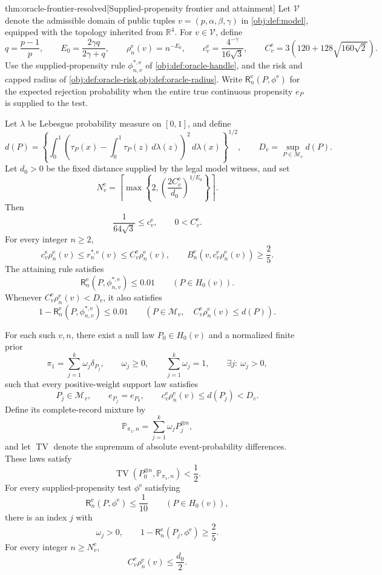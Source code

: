 \documentclass[11pt]{article}
\begin{document}
\begin{theoremv}{thm:oracle-frontier-resolved}[Supplied-propensity frontier and attainment]
Let \(\mathcal V\) denote the admissible domain of public tuples \(v=(p,\alpha,\beta,\gamma)\) in \cref{obj:def:model}, equipped with the topology inherited from \(\mathbb R^4\). For \(v\in\mathcal V\), define
\[
q=\frac{p-1}{p},\qquad
E_0=\frac{2\gamma q}{2\gamma+q},\qquad
\rho_n^{\mathrm e}(v)=n^{-E_0},\qquad
c^{\mathrm e}_v=\frac{4^{-\gamma}}{16\sqrt3},\qquad
C^{\mathrm e}_v=3\left(120+128\sqrt{160\sqrt2}\right).
\]
Use the supplied-propensity rule \(\phi^{*,\mathrm e}_{n,v}\) of \cref{obj:def:oracle-handle}, and the risk and capped radius of \cref{obj:def:oracle-risk,obj:def:oracle-radius}. Write \(\mathsf R_n^{\mathrm e}(P,\phi^{\mathrm e})\) for the expected rejection probability when the entire true continuous propensity \(e_P\) is supplied to the test.

Let \(\lambda\) be Lebesgue probability measure on \([0,1]\), and define
\[
d(P)=
\left\{\int_0^1
\left(\tau_P(x)-\int_0^1\tau_P(z)\,d\lambda(z)\right)^2
\,d\lambda(x)\right\}^{1/2},
\qquad
D_v=\sup_{P\in\mathcal M_v}d(P).
\]
Let \(d_0>0\) be the fixed distance supplied by the legal model witness, and set
\[
N^{\mathrm e}_v=
\left\lceil
\max\left\{2,\left(\frac{2C^{\mathrm e}_v}{d_0}\right)^{1/E_0}\right\}
\right\rceil.
\]
Then
\[
\frac{1}{64\sqrt3}\le c^{\mathrm e}_v,
\qquad
0<C^{\mathrm e}_v.
\]
For every integer \(n\ge2\),
\[
c^{\mathrm e}_v\rho_n^{\mathrm e}(v)
\le r_n^{*,\mathrm e}(v)
\le C^{\mathrm e}_v\rho_n^{\mathrm e}(v),
\qquad
B_n^{\mathrm e}\!\left(v,c^{\mathrm e}_v\rho_n^{\mathrm e}(v)\right)
\ge\frac25.
\]
The attaining rule satisfies
\[
\mathsf R_n^{\mathrm e}\!\left(P,\phi^{*,\mathrm e}_{n,v}\right)
\le0.01
\qquad(P\in H_0(v)).
\]
Whenever \(C^{\mathrm e}_v\rho_n^{\mathrm e}(v)<D_v\), it also satisfies
\[
1-\mathsf R_n^{\mathrm e}\!\left(P,\phi^{*,\mathrm e}_{n,v}\right)
\le0.01
\qquad
\left(P\in\mathcal M_v,\quad
C^{\mathrm e}_v\rho_n^{\mathrm e}(v)\le d(P)\right).
\]

For each such \(v,n\), there exist a null law \(P_0\in H_0(v)\) and a normalized finite prior
\[
\pi_1=\sum_{j=1}^{k}\omega_j\delta_{P_j},
\qquad
\omega_j\ge0,\qquad
\sum_{j=1}^{k}\omega_j=1,\qquad
\exists j:\ \omega_j>0,
\]
such that every positive-weight support law satisfies
\[
P_j\in\mathcal M_v,\qquad
e_{P_j}=e_{P_0},\qquad
c^{\mathrm e}_v\rho_n^{\mathrm e}(v)\le d(P_j)<D_v.
\]
Define its complete-record mixture by
\[
\mathbb P_{\pi_1,n}=\sum_{j=1}^{k}\omega_jP_j^{\otimes n},
\]
and let \(\operatorname{TV}\) denote the supremum of absolute event-probability differences. These laws satisfy
\[
\operatorname{TV}\!\left(P_0^{\otimes n},\mathbb P_{\pi_1,n}\right)<\frac12.
\]
For every supplied-propensity test \(\phi^{\mathrm e}\) satisfying
\[
\mathsf R_n^{\mathrm e}(P,\phi^{\mathrm e})\le\frac1{10}
\qquad(P\in H_0(v)),
\]
there is an index \(j\) with
\[
\omega_j>0,\qquad
1-\mathsf R_n^{\mathrm e}(P_j,\phi^{\mathrm e})\ge\frac25.
\]
For every integer \(n\ge N^{\mathrm e}_v\),
\[
C^{\mathrm e}_v\rho_n^{\mathrm e}(v)\le\frac{d_0}{2}.
\]


\end{theoremv}
\end{document}

